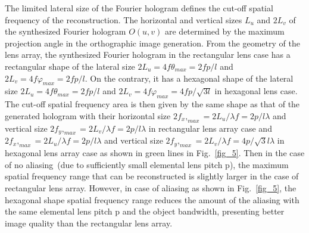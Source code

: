 \documentclass[10pt,letterpaper]{article}
\begin{document}
The limited lateral size of the Fourier hologram defines the cut-off spatial frequency of the reconstruction. The horizontal and vertical sizes $L_u$ and $2L_v$ of the synthesized Fourier hologram $O(u,v)$ are determined by the maximum projection angle in the orthographic image generation. From the geometry of the lens array, the synthesized Fourier hologram in the rectangular lens case has a rectangular shape of the lateral size $2L_u=4f\theta_{max}=2{fp}/l$ and $2L_v=4f\varphi_{max}=2{fp}/l$. On the contrary, it has a hexagonal shape of the lateral size $2L_u=4f\theta_{max}=2{fp}/l$ and $2L_v=4f\varphi_{max}=4{fp}/\sqrt{3l}$ in hexagonal lens case. The cut-off spatial frequency area is then given by the same shape as that of the generated hologram with their horizontal size $2f_x,_{max}=2L_u/\lambda f=2p/l\lambda$ and vertical size $2f_y,_{max}=2L_v/\lambda f=2p/l\lambda$ in rectangular lens array case and $2f_x,_{max}=2L_u/\lambda f=2p/l\lambda$ and vertical size $2f_y,_{max}=2L_v/\lambda f=4p/\sqrt{3}{l\lambda}$ in hexagonal lens array case as shown in green lines in Fig.~\ref{fig_5}. Then in the case of no aliasing~(due to sufficiently small elemental lens pitch p), the maximum spatial frequency range that can be reconstructed is slightly larger in the case of rectangular lens array. However, in case of aliasing as shown in Fig.~\ref{fig_5}, the hexagonal shape spatial frequency range reduces the amount of the aliasing with the same elemental lens pitch p  and the object bandwidth, presenting better image quality than the rectangular lens array. 
\end{document}
